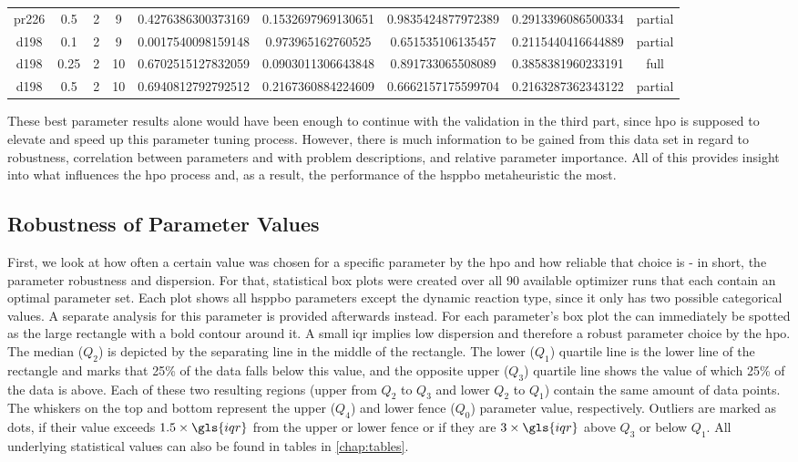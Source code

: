\begin{table}[h]
\begin{tabular}{cc | ccccccc}
		pr226 & 0.5 & 2 & 9 & \num{0.4276386300373169} & \num{0.1532697969130651} & \num{0.9835424877972389} & \num{0.2913396086500334} & partial \\ 
		d198 & 0.1 & 2 & 9 & \num{0.0017540098159148} & \num{0.973965162760525} & \num{0.651535106135457} & \num{0.2115440416644889} & partial \\ 
		d198 & 0.25 & 2 & 10 & \num{0.6702515127832059} & \num{0.0903011306643848} & \num{0.891733065508089} & \num{0.3858381960233191} & full \\ 
		d198 & 0.5 & 2 & 10 & \num{0.6940812792792512} & \num{0.2167360884224609} & \num{0.6662157175599704} & \num{0.2163287362343122} & partial \\ \hline
	\end{tabular}
\end{table}

These best parameter results alone would have been enough to continue with the validation in the third part, since \gls{hpo} is supposed to elevate and speed up this parameter tuning process. However, there is much information to be gained from this data set in regard to robustness, correlation between parameters and with problem descriptions, and relative parameter importance. All of this provides insight into what influences the \gls{hpo} process and, as a result, the performance of the \gls{hsppbo} metaheuristic the most.

\subsection{Robustness of Parameter Values}

First, we look at how often a certain value was chosen for a specific parameter by the \gls{hpo} and how reliable that choice is  - in short, the parameter robustness and dispersion. For that, statistical box plots were created over all 90 available optimizer runs that each contain an optimal parameter set. Each plot shows all \gls{hsppbo} parameters except the dynamic reaction type, since it only has two possible categorical values. A separate analysis for this parameter is provided afterwards instead. For each parameter's box plot the  can immediately be spotted as the large rectangle with a bold contour around it. A small \gls{iqr} implies low dispersion and therefore a robust parameter choice by the \gls{hpo}. The median ($Q_2$) is depicted by the separating line in the middle of the rectangle. The lower ($Q_1$) quartile line is the lower line of the rectangle and marks that 25\% of the data falls below this value, and the opposite upper ($Q_3$) quartile line shows the value of which 25\% of the data is above. Each of these two resulting regions (upper from $Q_2$ to $Q_3$ and lower $Q_2$ to $Q_1$) contain the same amount of data points. The whiskers on the top and bottom represent the upper ($Q_4$) and lower fence ($Q_0$) parameter value, respectively. Outliers are marked as dots, if their value exceeds $1.5 \times \gls{iqr}$ from the upper or lower fence or if they are $3 \times \gls{iqr}$ above $Q_3$ or below $Q_1$. All underlying statistical values can also be found in tables in \cref{chap:tables}.

